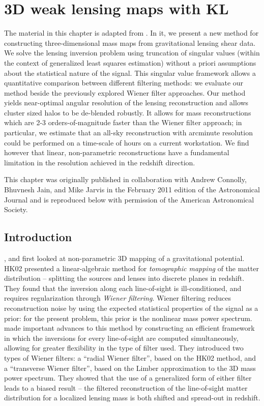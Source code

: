 \chapter{3D weak lensing maps with KL}

The material in this chapter is adapted from \citet{Vanderplas2011}.
In it, we present a new method for constructing three-dimensional
mass maps from gravitational lensing shear data.  We solve the lensing
inversion problem using truncation of singular values
(within the context of generalized
least squares estimation) without a priori assumptions about the
statistical nature of the signal.   This singular value framework 
allows a quantitative
comparison between different filtering methods: we evaluate our method
beside the previously explored Wiener filter approaches.
Our method yields near-optimal angular resolution of the lensing
reconstruction and allows cluster sized halos to be de-blended robustly.
It allows for mass reconstructions which are
2-3 orders-of-magnitude faster than the Wiener
filter approach; in particular, we estimate that an all-sky
reconstruction with arcminute resolution could be performed
on a time-scale of hours on a current workstation.
We find however that linear, 
non-parametric reconstructions have a fundamental limitation in the
resolution achieved in the redshift direction.

This chapter was originally published in collaboration with Andrew Connolly,
Bhuvnesh Jain, and Mike Jarvis in the February 2011 edition of the
Astronomical Journal \citep[][ApJ, Vol. 727, p. 118; \copyright ~2011 by
the American Astronomical Society]{Vanderplas2011} and is reproduced below
with permission of the American Astronomical Society.


\section{Introduction}

\citet{Taylor01}, \citet[][hereafter HK02]{Hu02} and 
\citet{Bacon03} first looked at
non-parametric 3D mapping of a gravitational potential.  HK02
presented a linear-algebraic method for \textit{tomographic mapping}
of the matter distribution -- splitting the sources and lenses into
discrete planes in redshift.  They found that the inversion along each
line-of-sight is ill-conditioned, and requires regularization through 
\textit{Wiener filtering}.  Wiener filtering reduces reconstruction noise
by using the expected statistical properties of the signal as a prior: 
for the present problem, this prior is the nonlinear mass power spectrum.  
\citet[][hereafter STH09]{Simon09}
made important advances to this method by constructing an efficient
framework in which the inversions for every line-of-sight are computed
simultaneously, allowing for greater flexibility in the
type of filter used.  They introduced two types of Wiener filters: 
a ``radial Wiener filter'', based on the HK02 method, 
and a ``transverse Wiener filter'', 
based on the Limber approximation to
the 3D mass power spectrum.
They showed that the use of a generalized form of either
filter leads to a biased result -- the filtered reconstruction of the
line-of-sight matter distribution for a localized lensing mass is both
shifted and spread-out in redshift.

